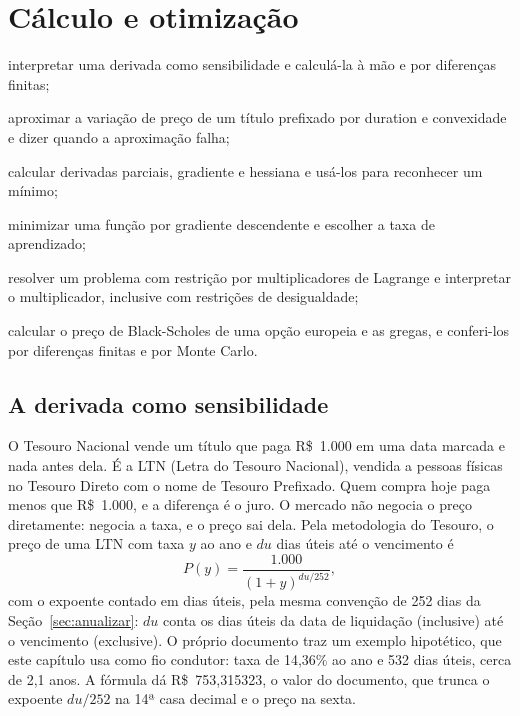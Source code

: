 \chapter{Cálculo e otimização}
\label{cap:calculo}


\begin{objetivos}
  \item interpretar uma derivada como sensibilidade e calculá-la à mão e por diferenças finitas;
  \item aproximar a variação de preço de um título prefixado por duration e convexidade e dizer quando a aproximação falha;
  \item calcular derivadas parciais, gradiente e hessiana e usá-los para reconhecer um mínimo;
  \item minimizar uma função por gradiente descendente e escolher a taxa de aprendizado;
  \item resolver um problema com restrição por multiplicadores de Lagrange e interpretar o multiplicador, inclusive com restrições de desigualdade;
  \item calcular o preço de Black-Scholes de uma opção europeia e as gregas, e conferi-los por diferenças finitas e por Monte Carlo.
\end{objetivos}

\section{A derivada como sensibilidade}
\label{sec:c05-derivada}

O Tesouro Nacional vende um título que paga R\$~1.000 em uma data marcada e nada antes dela. É a LTN (Letra do Tesouro Nacional), vendida a pessoas físicas no Tesouro Direto com o nome de Tesouro Prefixado. Quem compra hoje paga menos que R\$~1.000, e a diferença é o juro. O mercado não negocia o preço diretamente: negocia a taxa, e o preço sai dela. Pela metodologia do Tesouro, o preço de uma LTN com taxa $y$ ao ano e $du$ dias úteis até o vencimento é \citep{stn2024}
\begin{equation}
  P(y) = \frac{1.000}{(1+y)^{du/252}} ,
  \label{eq:c05-ltn}
\end{equation}
com o expoente contado em dias úteis, pela mesma convenção de 252 dias da Seção~\ref{sec:anualizar}: $du$ conta os dias úteis da data de liquidação (inclusive) até o vencimento (exclusive). O próprio documento traz um exemplo hipotético, que este capítulo usa como fio condutor: taxa de 14,36\% ao ano e 532 dias úteis, cerca de 2,1 anos. A fórmula dá R\$~753,315323, o valor do documento, que trunca o expoente $du/252$ na 14ª casa decimal e o preço na sexta.


